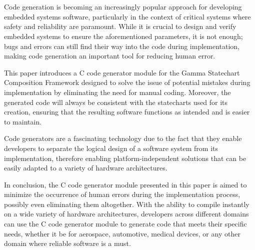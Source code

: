 \chapter{\bevezetes}

Code generation is becoming an increasingly popular approach for developing embedded systems software, particularly in the context of critical systems where safety and reliability are paramount. While it is crucial to design and verify embedded systems to ensure the aforementioned parameters, it is not enough; bugs and errors can still find their way into the code during implementation, making code generation an important tool for reducing human error.

This paper introduces a C code generator module for the Gamma Statechart Composition Framework designed to solve the issue of potential mistakes during implementation by eliminating the need for manual coding. Moreover, the generated code will always be consistent with the statecharts used for its creation, ensuring that the resulting software functions as intended and is easier to maintain.

Code generators are a fascinating technology due to the fact that they enable developers to separate the logical design of a software system from its implementation, therefore enabling platform-independent solutions that can be easily adapted to a variety of hardware architectures.

In conclusion, the C code generator module presented in this paper is aimed to minimize the occurrence of human errors during the implementation process, possibly even eliminating them altogether. With the ability to compile instantly on a wide variety of hardware architectures, developers across different domains can use the C code generator module to generate code that meets their specific needs, whether it be for aerospace, automotive, medical devices, or any other domain where reliable software is a must.